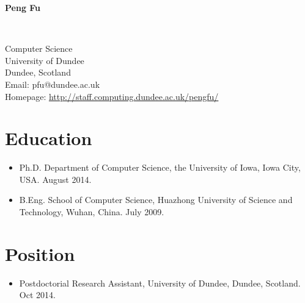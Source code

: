 \documentclass[11pt]{article}
\begin{document}
\begin{center}
{\Large{\bfseries Peng Fu}}

\

Computer Science\\
University of Dundee\\
Dundee, Scotland \\
Email: pfu@dundee.ac.uk\\
Homepage: \url{http://staff.computing.dundee.ac.uk/pengfu/}

\end{center}



\section*{Education}

\begin{itemize}
\item Ph.D. Department of Computer Science, the University of Iowa, Iowa City, USA. August 2014. 
  \item B.Eng. School of Computer Science, Huazhong University of Science and Technology, Wuhan, China. July 2009. %
\end{itemize}

\section*{Position}

\begin{itemize}
\item Postdoctorial Research Assistant, University of Dundee, Dundee, Scotland. Oct 2014.
\end{itemize}
\end{document}
